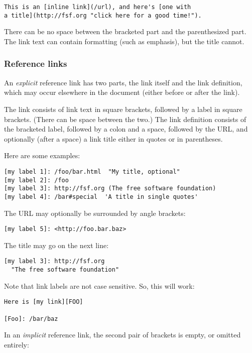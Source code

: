\documentclass[]{article}
\begin{document}
\begin{verbatim}
This is an [inline link](/url), and here's [one with
a title](http://fsf.org "click here for a good time!").
\end{verbatim}

There can be no space between the bracketed part and the parenthesized
part. The link text can contain formatting (such as emphasis), but the
title cannot.

\subsubsection{Reference links}

An \emph{explicit} reference link has two parts, the link itself and the
link definition, which may occur elsewhere in the document (either
before or after the link).

The link consists of link text in square brackets, followed by a label
in square brackets. (There can be space between the two.) The link
definition consists of the bracketed label, followed by a colon and a
space, followed by the URL, and optionally (after a space) a link title
either in quotes or in parentheses.

Here are some examples:

\begin{verbatim}
[my label 1]: /foo/bar.html  "My title, optional"
[my label 2]: /foo
[my label 3]: http://fsf.org (The free software foundation)
[my label 4]: /bar#special  'A title in single quotes'
\end{verbatim}

The URL may optionally be surrounded by angle brackets:

\begin{verbatim}
[my label 5]: <http://foo.bar.baz>
\end{verbatim}

The title may go on the next line:

\begin{verbatim}
[my label 3]: http://fsf.org
  "The free software foundation"
\end{verbatim}

Note that link labels are not case sensitive. So, this will work:

\begin{verbatim}
Here is [my link][FOO]

[Foo]: /bar/baz
\end{verbatim}

In an \emph{implicit} reference link, the second pair of brackets is
empty, or omitted entirely:
\end{document}
